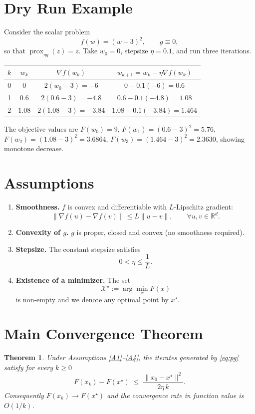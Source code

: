 \documentclass{article}
\newtheorem{theorem}{Theorem}
\begin{document}
\section*{Dry Run Example}
Consider the scalar problem
\[
f(w)=(w-3)^{2},\qquad g\equiv0,
\]
so that $\operatorname{prox}_{\eta g}(z)=z$.  
Take $w_{0}=0$, stepsize $\eta=0.1$, and run three iterations.

\begin{center}
\begin{tabular}{c|c|c|c}
$k$ & $w_{k}$ & $\nabla f(w_{k})$ & $w_{k+1}=w_{k}-\eta\nabla f(w_{k})$\\ \hline
0 & $0$ & $2(w_{0}-3)=-6$ & $0-0.1(-6)=0.6$\\
1 & $0.6$ & $2(0.6-3)=-4.8$ & $0.6-0.1(-4.8)=1.08$\\
2 & $1.08$ & $2(1.08-3)=-3.84$ & $1.08-0.1(-3.84)=1.464$\\
\end{tabular}
\end{center}
The objective values are $F(w_{0})=9$, $F(w_{1})=(0.6-3)^{2}=5.76$, $F(w_{2})= (1.08-3)^{2}=3.6864$, $F(w_{3})=(1.464-3)^{2}=2.3630$, showing monotone decrease.

\newpage
\section*{Assumptions}
\begin{enumerate}[label={\bf(A\arabic*)}, leftmargin=*]
\item \label{A1} \textbf{Smoothness.} $f$ is convex and differentiable with $L$‑Lipschitz gradient:
\[
\|\nabla f(u)-\nabla f(v)\|\le L\|u-v\|,\qquad\forall u,v\in\mathbb{R}^{d}.
\]

\item \label{A2} \textbf{Convexity of $g$.} $g$ is proper, closed and convex (no smoothness required).

\item \label{A3} \textbf{Stepsize.} The constant stepsize satisfies
\[
0<\eta\le \frac{1}{L}.
\]

\item \label{A4} \textbf{Existence of a minimizer.} The set 
\[
\mathcal{X}^{\star}:=\arg\min_{x}F(x)
\]
is non‑empty and we denote any optimal point by $x^{\star}$.
\end{enumerate}

\section*{Main Convergence Theorem}
\begin{theorem}\label{thm:rate}
Under Assumptions \ref{A1}–\ref{A4}, the iterates generated by \eqref{eq:pg} satisfy for every $k\ge 0$
\begin{equation}\label{eq:func-decrease}
F(x_{k})-F(x^{\star})\;\le\;\frac{\|x_{0}-x^{\star}\|^{2}}{2\eta\,k}.
\end{equation}
Consequently $F(x_{k})\to F(x^{\star})$ and the convergence rate in function value is $O(1/k)$.
\end{theorem}
\end{document}
